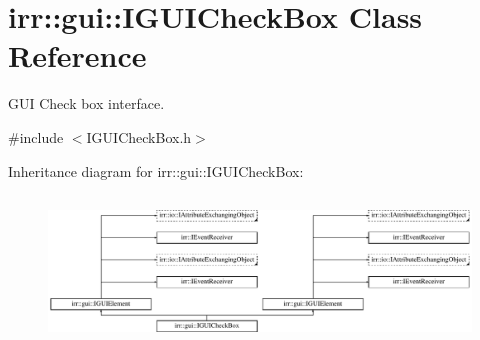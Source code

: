 \hypertarget{classirr_1_1gui_1_1IGUICheckBox}{}\section{irr\+:\+:gui\+:\+:I\+G\+U\+I\+Check\+Box Class Reference}
\label{classirr_1_1gui_1_1IGUICheckBox}


G\+UI Check box interface.  




{\ttfamily \#include $<$I\+G\+U\+I\+Check\+Box.\+h$>$}

Inheritance diagram for irr\+:\+:gui\+:\+:I\+G\+U\+I\+Check\+Box\+:\begin{figure}[H]
\begin{center}
\leavevmode
\includegraphics[height=4.038462cm]{classirr_1_1gui_1_1IGUICheckBox}
\end{center}
\end{figure}

